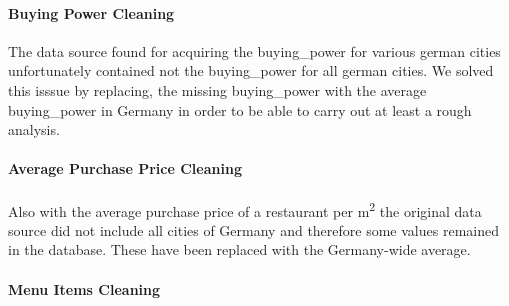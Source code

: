 \paragraph{Buying Power Cleaning}
The data source found for acquiring the buying\_power for various german cities unfortunately contained not the buying\_power for all german cities.
We solved this isssue by replacing, the missing buying\_power with the average buying\_power in Germany in order to be able to carry out at least a rough analysis.
\paragraph{Average Purchase Price Cleaning}
Also with the average purchase price of a restaurant per m\textsuperscript{2} the original data source did not include all cities of Germany and therefore
some  values remained in the database.
These have been replaced with the Germany-wide average.
\paragraph{Menu Items Cleaning}
